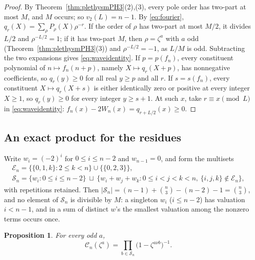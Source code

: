 \documentclass[11pt,a4paper]{article}
\newtheorem{proposition}[theorem]{Proposition}
\theoremstyle{definition}
\begin{document}
\begin{proof}
By Theorem~\ref{thm:plethysmPH3}(2),(3), every pole order has two-part at most
$M$, and $M$ occurs; so $v_2(L)=n-1$. By \eqref{eq:fourier},
$q_r(X)=\sum_\rho P_\rho(X)\rho^{-r}$. If the order of $\rho$ has two-part at
most $M/2$, it divides $L/2$ and $\rho^{-L/2}=1$; if it has two-part $M$, then
$\rho=\zeta^a$ with $a$ odd (Theorem~\ref{thm:plethysmPH3}(3)) and
$\rho^{-L/2}=-1$, as $L/M$ is odd. Subtracting the two expansions gives
\eqref{eq:waveidentity}. If $p=p(f_n)$, every constituent polynomial of
$n\mapsto f_n(n+p)$, namely $X\mapsto q_r(X+p)$, has nonnegative coefficients,
so $q_r(y)\ge0$ for all real $y\ge p$ and all $r$. If $s=s(f_n)$, every
constituent $X\mapsto q_r(X+s)$ is either identically zero or positive at every
integer $X\ge1$, so $q_r(y)\ge0$ for every integer $y\ge s+1$. At such $x$, take
$r\equiv x\pmod L$ in \eqref{eq:waveidentity}: $f_n(x)-2W_n(x)=
q_{r+L/2}(x)\ge0$.
\end{proof}

\subsection{An exact product for the residues}

Write $w_i=(-2)^i$ for $0\le i\le n-2$ and $w_{n-1}=0$, and form the multisets
\begin{equation}\label{eq:Sn}
\begin{gathered}
 \mathcal E_n=\{\{0,1,k\}:2\le k<n\}\cup\{\{0,2,3\}\},\\
 \mathcal S_n=\{w_i:0\le i\le n-2\}\ \sqcup\ \{w_i+w_j+w_k:0\le i<j<k<n,\
 \{i,j,k\}\notin\mathcal E_n\},
\end{gathered}
\end{equation}
with repetitions retained. Then $|\mathcal S_n|=(n-1)+\binom n3-(n-2)-1=
\binom n3$, and no element of $\mathcal S_n$ is divisible by $M$: a singleton
$w_i$ ($i\le n-2$) has valuation $i<n-1$, and in a sum of distinct $w$'s the
smallest valuation among the nonzero terms occurs once.

\begin{proposition}\label{prop:product}
For every odd $a$,
\begin{equation}\label{eq:product}
 \mathcal C_n(\zeta^a)=\prod_{b\in\mathcal S_n}\bigl(1-\zeta^{a\nu b}\bigr)^{-1}.
\end{equation}
\end{proposition}
\end{document}
